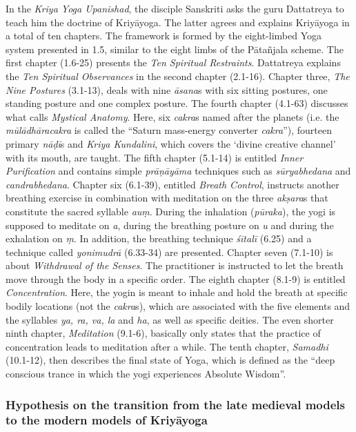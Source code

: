 In the \textit{Kriya Yoga Upanishad}, the disciple Sanskriti asks the guru Dattatreya to teach him the doctrine of Kriyāyoga. The latter agrees and explains Kriyāyoga in a total of ten chapters. The framework is formed by the eight-limbed Yoga system presented in 1.5, similar to the eight limbs of the Pātañjala scheme. The first chapter (1.6-25) presents the \textit{Ten Spiritual Restraints}. Dattatreya explains the \textit{Ten Spiritual Observances} in the second chapter (2.1-16). Chapter three, \textit{The Nine Postures} (3.1-13), deals with nine \textit{āsana}s with six sitting postures, one standing posture and one complex posture. The fourth chapter (4.1-63) discusses what \citeauthor{kriyayogaupanishad1993} calls \textit{Mystical Anatomy}. Here, six \textit{cakra}s named after the planets (i.e. the \textit{mūlādhāracakra} is called the ``Saturn mass-energy converter \textit{cakra}''), fourteen primary \textit{nāḍī}s and \textit{Kriya Kundalini}, which covers the `divine creative channel' with its mouth, are taught. The fifth chapter (5.1-14) is entitled \textit{Inner Purification} and contains simple \textit{prāṇāyāma} techniques such as \textit{sūryabhedana} and \textit{candrabhedana}. Chapter six (6.1-39), entitled \textit{Breath Control}, instructs another breathing exercise in combination with meditation on the three \textit{akṣara}s that constitute the sacred syllable \textit{auṃ}. During the inhalation (\textit{pūraka}), the yogi is supposed to meditate on \textit{a}, during the breathing posture on \textit{u} and during the exhalation on \textit{ṃ}. In addition, the breathing technique \textit{śītalī} (6.25) and a technique called \textit{yonimudrā} (6.33-34) are presented. Chapter seven (7.1-10) is about \textit{Withdrawal of the Senses}. The practitioner is instructed to let the breath move through the body in a specific order. The eighth chapter (8.1-9) is entitled \textit{Concentration}. Here, the yogin is meant to inhale and hold the breath at specific bodily locations (not the \textit{cakra}s), which are associated with the five elements and the syllables \textit{ya, ra, va, la} and \textit {ha}, as well as specific deities. The even shorter ninth chapter, \textit{Meditation} (9.1-6), basically only states that the practice of concentration leads to meditation after a while. The tenth chapter, \textit{Samadhi} (10.1-12), then describes the final state of Yoga, which is defined as the ``deep conscious trance in which the yogi experiences Absolute Wisdom''.

\subsubsection{Hypothesis on the transition from the late medieval models to the modern models of Kriyāyoga}

